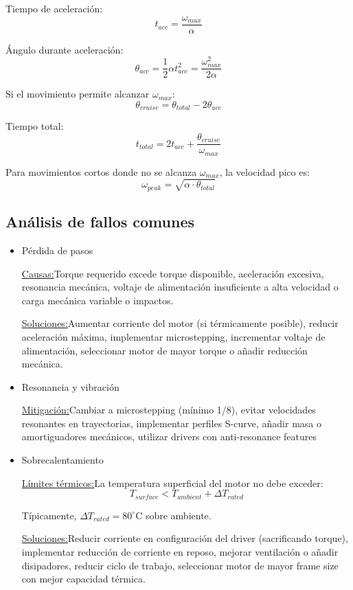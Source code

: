 Tiempo de aceleración:
\begin{equation}
t_{acc} = \frac{\omega_{max}}{\alpha}
\end{equation}

Ángulo durante aceleración:
\begin{equation}
\theta_{acc} = \frac{1}{2}\alpha t_{acc}^2 = \frac{\omega_{max}^2}{2\alpha}
\end{equation}

Si el movimiento permite alcanzar $\omega_{max}$:
\begin{equation}
\theta_{cruise} = \theta_{total} - 2\theta_{acc}
\end{equation}

Tiempo total:
\begin{equation}
t_{total} = 2t_{acc} + \frac{\theta_{cruise}}{\omega_{max}}
\end{equation}

Para movimientos cortos donde no se alcanza $\omega_{max}$, la velocidad pico es:
\begin{equation}
\omega_{peak} = \sqrt{\alpha \cdot \theta_{total}}
\end{equation}

\subsection{Análisis de fallos comunes}
\begin{itemize}

    \item{Pérdida de pasos}

\underline{Causas:}Torque requerido excede torque disponible, aceleración excesiva, resonancia mecánica, voltaje de alimentación insuficiente a alta velocidad o carga mecánica variable o impactos.

\underline{Soluciones:}Aumentar corriente del motor (si térmicamente posible), reducir aceleración máxima, implementar microstepping, incrementar voltaje de alimentación, seleccionar motor de mayor torque o añadir reducción mecánica.

    \item{Resonancia y vibración}

\underline{Mitigación:}Cambiar a microstepping (mínimo 1/8), evitar velocidades resonantes en trayectorias, implementar perfiles S-curve, añadir masa o amortiguadores mecánicos, utilizar drivers con anti-resonance features

    \item {Sobrecalentamiento}

\underline{Límites térmicos:}La temperatura superficial del motor no debe exceder:
\begin{equation}
T_{surface} < T_{ambient} + \Delta T_{rated}
\end{equation}

Típicamente, $\Delta T_{rated} = 80^\circ$C sobre ambiente.

\underline{Soluciones:}Reducir corriente en configuración del driver (sacrificando torque), implementar reducción de corriente en reposo, mejorar ventilación o añadir disipadores, reducir ciclo de trabajo, seleccionar motor de mayor frame size con mejor capacidad térmica.
\end{itemize}

